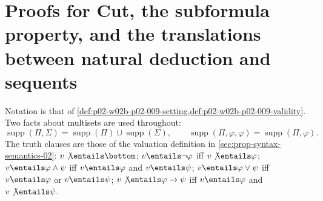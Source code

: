\section{Proofs for Cut, the subformula property, and the translations between natural deduction and sequents}
\label{sec:annex-p02-w02b-p02-009-cut-translations}

Notation is that of \cref{def:p02-w02b-p02-009-setting,def:p02-w02b-p02-009-validity}.
Two facts about multisets are used throughout:
\[
 \operatorname{supp}(\Pi,\Sigma)
 =\operatorname{supp}(\Pi)\cup\operatorname{supp}(\Sigma),
 \qquad
 \operatorname{supp}(\Pi,\varphi,\varphi)=\operatorname{supp}(\Pi,\varphi).
\]
The truth clauses are those of the valuation definition in
\cref{sec:prop-syntax-semantics-02}: \(v\not\entails\bottom\);
\(v\entails\neg\varphi\) iff \(v\not\entails\varphi\);
\(v\entails\varphi\land\psi\) iff \(v\entails\varphi\) and \(v\entails\psi\);
\(v\entails\varphi\lor\psi\) iff \(v\entails\varphi\) or \(v\entails\psi\);
\(v\not\entails\varphi\to\psi\) iff \(v\entails\varphi\) and
\(v\not\entails\psi\).

